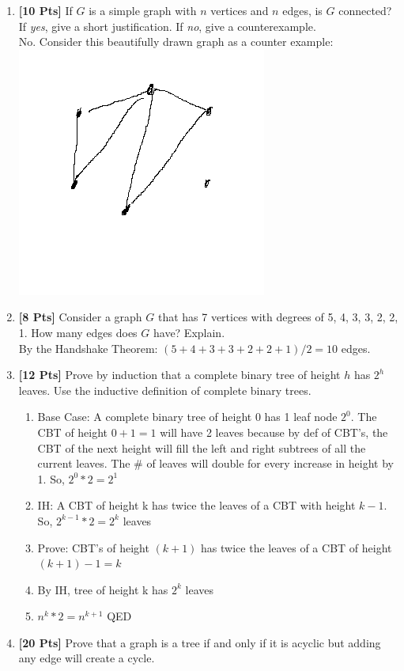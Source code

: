 \documentclass[11pt]{article}
\begin{document}
    \begin{enumerate}

        \item {\bf [10 Pts]} If $G$ is a simple graph with $n$ vertices and $n$ edges,
        is $G$ connected? If {\it yes}, give a short justification. If {\it no}, give
        a counterexample. \\
        No. Consider this beautifully drawn graph as a counter example: \\
        \includegraphics{graph.png}


        \item {\bf [8 Pts]} Consider a graph $G$ that has 7 vertices with degrees of 5, 4, 3, 3, 2, 2, 1. How many edges does $G$ have? Explain. \\
        By the Handshake Theorem: $(5+4+3+3+2+2+1)/2 = 10$ edges.

        \item {\bf [12 Pts]} Prove by induction that a complete binary tree of height $h$ has $2^h$ leaves. Use the inductive definition of complete binary trees.
        \begin{enumerate}
            \item Base Case: A complete binary tree of height 0 has 1 leaf node $2^0$. The CBT of height $0 + 1 = 1$ will have 2 leaves because by def of CBT's, the CBT of the next height will fill the left and right subtrees of all the current leaves. The \# of leaves will double for every increase in height by 1. So, $2^0*2 = 2^1$
            \item IH: A CBT of height k has twice the leaves of a CBT with height $k - 1$. So, $2^{k - 1}*2 = 2^k$ leaves
            \item Prove: CBT's of height $(k + 1)$ has twice the leaves of a CBT of height $(k + 1) - 1 = k$
            \item By IH, tree of height k has $2^k$ leaves
            \item $n^{k} * 2 = n^{k+1}$ \null\hfill QED
        \end{enumerate}

        \item {\bf [20 Pts]} Prove that a graph is a tree if and only if it is acyclic but adding any edge will create a cycle.


    \end{enumerate}
\end{document}
